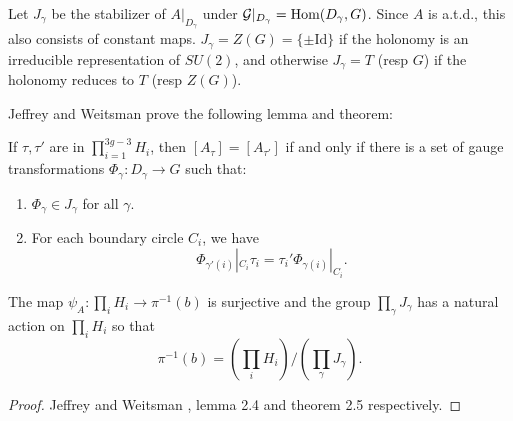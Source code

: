 	Let $J_\gamma$ be the stabilizer of $A|_{D_\gamma}$ under $\mathcal{G}|_{D_\gamma} = \text{Hom}(D_\gamma,G)$. Since $A$ is a.t.d., this also consists of constant maps. $J_\gamma = Z(G) = \{\pm \text{Id}\}$ if the holonomy is an irreducible representation of $SU(2)$, and otherwise $J_\gamma =T$ (resp $G$) if the holonomy reduces to $T$ (resp $Z(G)$).  
	
	Jeffrey and Weitsman prove the following lemma and theorem:
	\begin{lemma}
		If $\tau,\tau'$ are in $\prod_{i=1}^{3g-3} H_i$, then $[A_\tau] = [A_{\tau'}]$ if and only if there is a set of gauge transformations $\Phi_\gamma:D_\gamma \to G$ such that:
		\begin{enumerate}
			\item $\Phi_\gamma \in J_\gamma$ for all $\gamma$.
			\item For each boundary circle $C_i$, we have
			$$
				\Phi_{\gamma'(i)}|_{C_i} \tau_i = \tau_i' \Phi_{\gamma(i)}|_{C_i}.
			$$
		\end{enumerate}
	\end{lemma} 
	\begin{theorem}
		The map $\psi_A:\prod_i H_i \to \pi^{-1}(b)$ is surjective and the group $\prod_\gamma J_\gamma$ has a natural action on $\prod_i H_i$ so that
		\begin{equation}
			\pi^{-1}(b) = \left(\prod_i H_i\right)/\left(\prod_\gamma J_\gamma\right).
		\end{equation}
	\end{theorem}
	\begin{proof}
		Jeffrey and Weitsman \cite{jeffrey_bohr-sommerfeld_1992}, lemma 2.4 and theorem 2.5 respectively.
	\end{proof}

